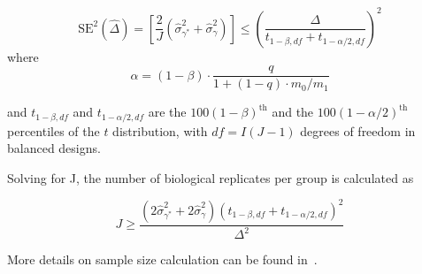 \documentclass[mcp]{article}
\numberwithin{table}{section}
\begin{document}
\begin{equation}
\mathrm{SE}^{2}(\hat{\Delta}) = \left[ \frac{2}{J} \left( \hat{\sigma}_{\gamma^{\ast}}^{2} + \hat{\sigma}_{\gamma}^{2} \right) \right]
\leq \left( \frac{\Delta}{t_{1-\beta, df} + t_{1-\alpha /2, df}} \right)^{2}
\end{equation}
where 
\begin{equation}
\alpha = (1 - \beta) \cdot \frac{q}{1 + (1-q) \cdot m_0 / m_1}
\end{equation}

and $t_{1-\beta, df}$ and $t_{1-\alpha /2, df}$ are the $100(1-\beta)^{\text{th}}$ and the $100(1-\alpha /2)^{\text{th}}$ percentiles of the $t$ distribution, with $df = I(J-1)$ degrees of freedom in balanced designs. 

Solving for J, the number of biological replicates per group is calculated as 

\begin{equation}
J \geq \frac{(2\hat{\sigma}_{\gamma^{\ast}}^{2} + 2\hat{\sigma}_{\gamma}^{2})(t_{1-\beta, df} + t_{1-\alpha /2, df})^2}{\Delta^2}
\end{equation}

More details on sample size calculation can be found in~\cite{oberg_vitek_09a}. 


\end{document}

